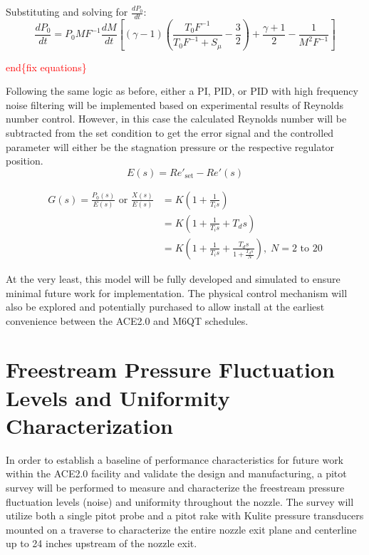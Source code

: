 \noindent Substituting and solving for $\frac{dP_0}{dt}$:
\begin{equation}
    \frac{dP_0}{dt} = P_0 M F^{-1} \frac{dM}{dt} \left[ (\gamma-1) \left( \frac{T_0 F^{-1}}{T_0 F^{-1} + S_\mu} - \frac{3}{2} \right) + \frac{\gamma+1}{2} - \frac{1}{M^2 F^{-1}} \right]
\end{equation}

\textcolor{red}{end\{fix equations\}}

Following the same logic as before, either a PI, PID, or PID with high frequency noise filtering will be implemented based on experimental results of Reynolds number control. However, in this case the calculated Reynolds number will be subtracted from the set condition to get the error signal and the controlled parameter will either be the stagnation pressure or the respective regulator position.
\begin{equation}
    E(s) = Re'_{\mathrm{set}} - Re'(s)
\end{equation}

\vspace{-1.5cm}
\begin{subequations}
    \begin{align}
        G(s) = \frac{P_0(s)}{E(s)} \textrm{ or } \frac{X(s)}{E(s)} &= K \left(1 + \frac{1}{T_i s}\right) \label{eq:Re-PI}\\
                                 &= K \left(1 + \frac{1}{T_i s} + T_d s\right) \label{eq:Re-PID}\\
                                 &= K \left(1 + \frac{1}{T_i s} + \frac{T_d s}{1+\frac{T_d s}{N}}\right), \; N=2\textrm{ to }20 \label{eq:Re-PID-filter}
    \end{align}
\end{subequations}

At the very least, this model will be fully developed and simulated to ensure minimal future work for implementation. The physical control mechanism will also be explored and potentially purchased to allow install at the earliest convenience between the ACE2.0 and M6QT schedules.

\section{Freestream Pressure Fluctuation Levels and Uniformity Characterization}

In order to establish a baseline of performance characteristics for future work within the ACE2.0 facility and validate the design and manufacturing, a pitot survey will be performed to measure and characterize the freestream pressure fluctuation levels (noise) and uniformity throughout the nozzle. The survey will utilize both a single pitot probe and a pitot rake with Kulite pressure transducers mounted on a traverse to characterize the entire nozzle exit plane and centerline up to 24 inches upstream of the nozzle exit.

